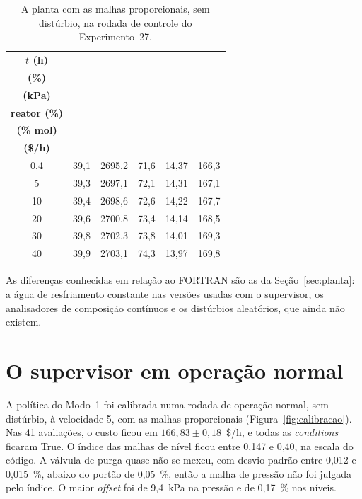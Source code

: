 \begin{table}[htbp]
	\centering
	\caption{A planta com as malhas proporcionais, sem distúrbio, na rodada de controle do Experimento~27.}
	\label{tab:controle_p}
	\footnotesize
	\begin{tabular}{|c|c|c|c|c|c|}
		\hline
		\textbf{$t$ (h)} & \cabecalho{\textbf{Purga}\\\textbf{(\%)}} & \cabecalho{\textbf{Pressão}\\\textbf{(kPa)}} & \cabecalho{\textbf{Nível do}\\\textbf{reator (\%)}} & \cabecalho{\textbf{B na purga}\\\textbf{(\% mol)}} & \cabecalho{\textbf{$J$}\\\textbf{(\$/h)}} \\
		\hline
		0,4 & 39,1 & 2695,2 & 71,6 & 14,37 & 166,3 \\
		5 & 39,3 & 2697,1 & 72,1 & 14,31 & 167,1 \\
		10 & 39,4 & 2698,6 & 72,6 & 14,22 & 167,7 \\
		20 & 39,6 & 2700,8 & 73,4 & 14,14 & 168,5 \\
		30 & 39,8 & 2702,3 & 73,8 & 14,01 & 169,3 \\
		40 & 39,9 & 2703,1 & 74,3 & 13,97 & 169,8 \\
		\hline
	\end{tabular}
\end{table}

As diferenças conhecidas em relação ao FORTRAN são as da Seção~\ref{sec:planta}: a água de resfriamento constante nas versões usadas com o supervisor, os analisadores de composição contínuos e os distúrbios aleatórios, que ainda não existem.

\FloatBarrier
\section{O supervisor em operação normal}
\label{sec:sup_nominal}

A política do Modo~1 foi calibrada numa rodada de operação normal, sem distúrbio, à velocidade 5, com as malhas proporcionais (Figura~\ref{fig:calibracao}). Nas 41 avaliações, o custo ficou em $166{,}83 \pm 0{,}18$~\$/h, e todas as \textit{conditions} ficaram True. O índice das malhas de nível ficou entre 0,147 e 0,40, na escala do código. A válvula de purga quase não se mexeu, com desvio padrão entre 0,012 e 0,015~\%, abaixo do portão de 0,05~\%, então a malha de pressão não foi julgada pelo índice. O maior \textit{offset} foi de 9,4~kPa na pressão e de 0,17~\% nos níveis.

